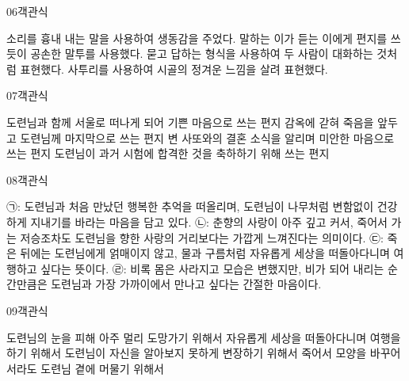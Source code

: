\documentclass[fs95,seriesFre]{korfarm-base}
\begin{document}
\begin{kfQBlock}{06}{객관식}
\begin{kfChoices}
\kfChoice 소리를 흉내 내는 말을 사용하여 생동감을 주었다.
\kfChoice 말하는 이가 듣는 이에게 편지를 쓰듯이 공손한 말투를 사용했다.
\kfChoice 묻고 답하는 형식을 사용하여 두 사람이 대화하는 것처럼 표현했다.
\kfChoice 사투리를 사용하여 시골의 정겨운 느낌을 살려 표현했다.
\end{kfChoices}
\end{kfQBlock}

\begin{kfQBlock}{07}{객관식}
\begin{kfChoices}
\kfChoice 도련님과 함께 서울로 떠나게 되어 기쁜 마음으로 쓰는 편지
\kfChoice 감옥에 갇혀 죽음을 앞두고 도련님께 마지막으로 쓰는 편지
\kfChoice 변 사또와의 결혼 소식을 알리며 미안한 마음으로 쓰는 편지
\kfChoice 도련님이 과거 시험에 합격한 것을 축하하기 위해 쓰는 편지
\end{kfChoices}
\end{kfQBlock}

\begin{kfQBlock}{08}{객관식}
\begin{kfChoices}
\kfChoice ㉠: 도련님과 처음 만났던 행복한 추억을 떠올리며, 도련님이 나무처럼 변함없이 건강하게 지내기를 바라는 마음을 담고 있다.
\kfChoice ㉡: 춘향의 사랑이 아주 깊고 커서, 죽어서 가는 저승조차도 도련님을 향한 사랑의 거리보다는 가깝게 느껴진다는 의미이다.
\kfChoice ㉢: 죽은 뒤에는 도련님에게 얽매이지 않고, 물과 구름처럼 자유롭게 세상을 떠돌아다니며 여행하고 싶다는 뜻이다.
\kfChoice ㉣: 비록 몸은 사라지고 모습은 변했지만, 비가 되어 내리는 순간만큼은 도련님과 가장 가까이에서 만나고 싶다는 간절한 마음이다.
\end{kfChoices}
\end{kfQBlock}

\begin{kfQBlock}{09}{객관식}
\begin{kfChoices}
\kfChoice 도련님의 눈을 피해 아주 멀리 도망가기 위해서
\kfChoice 자유롭게 세상을 떠돌아다니며 여행을 하기 위해서
\kfChoice 도련님이 자신을 알아보지 못하게 변장하기 위해서
\kfChoice 죽어서 모양을 바꾸어서라도 도련님 곁에 머물기 위해서
\end{kfChoices}
\end{kfQBlock}
\end{document}
